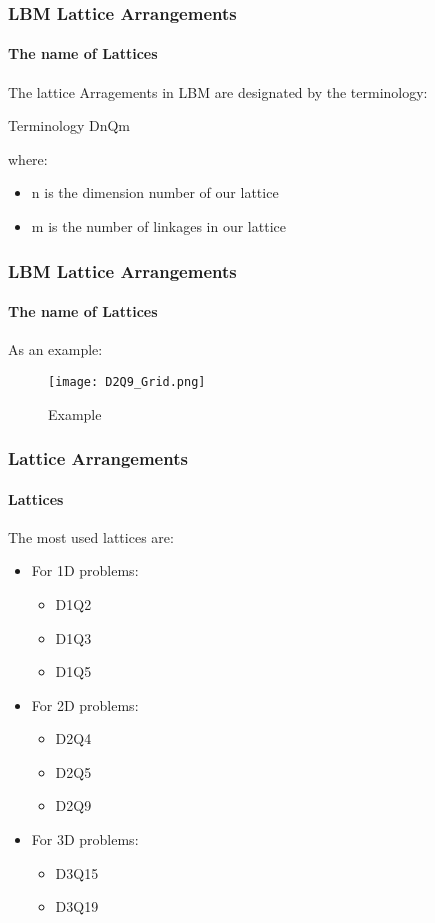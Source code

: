 \documentclass[12pt]{beamer}
\begin{document}
\begin{frame}
  \frametitle{LBM Lattice Arrangements}
  \framesubtitle{The name of Lattices}
  The lattice Arragements in LBM are designated by the terminology:
  \begin{block}{Terminology}
    \centering
    D\alert{n}Q\alert{m}
  \end{block}
  where: \\
  \begin{itemize}
   \item \alert{n} is the dimension number of our lattice
   \item \alert{m} is the number of linkages in our lattice
  \end{itemize}
\end{frame}

\begin{frame}
   \frametitle{LBM Lattice Arrangements}
   \framesubtitle{The name of Lattices}
  As an example:
  \begin{figure}
    \centering
    \texttt{[image: D2Q9\_Grid.png]}
    \caption{Example}
    \label{example_fig}
  \end{figure}
\end{frame}

\begin{frame}
  \frametitle{Lattice Arrangements}
  \framesubtitle{Lattices}
  The most used lattices are:
  \begin{itemize}
    \item For 1D problems:
      \begin{itemize}
	\item D1Q2
	\item D1Q3
	\item D1Q5
      \end{itemize}
    \item For 2D problems:
      \begin{itemize}
	\item D2Q4
	\item D2Q5
	\item D2Q9
      \end{itemize}
    \item For 3D problems:
      \begin{itemize}
	\item D3Q15
	\item D3Q19
      \end{itemize}
  \end{itemize}
\end{frame}
\end{document}
